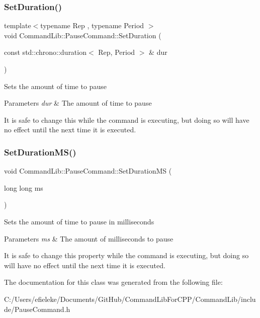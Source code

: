 \subsubsection{\texorpdfstring{Set\+Duration()}{SetDuration()}}
{\footnotesize\ttfamily template$<$typename Rep , typename Period $>$ \\
void Command\+Lib\+::\+Pause\+Command\+::\+Set\+Duration (\begin{DoxyParamCaption}\item[{const std\+::chrono\+::duration$<$ Rep, Period $>$ \&}]{dur }\end{DoxyParamCaption})\hspace{0.3cm}{\ttfamily [inline]}}



Sets the amount of time to pause 


\begin{DoxyParams}{Parameters}
{\em dur} & The amount of time to pause\\
\hline
\end{DoxyParams}


It is safe to change this while the command is executing, but doing so will have no effect until the next time it is executed.\mbox{\label{class_command_lib_1_1_pause_command_a87681b8e122468292369874bad63bc8e}} 
\subsubsection{\texorpdfstring{Set\+Duration\+M\+S()}{SetDurationMS()}}
{\footnotesize\ttfamily void Command\+Lib\+::\+Pause\+Command\+::\+Set\+Duration\+MS (\begin{DoxyParamCaption}\item[{long long}]{ms }\end{DoxyParamCaption})}



Sets the amount of time to pause in milliseconds 


\begin{DoxyParams}{Parameters}
{\em ms} & The amount of milliseconds to pause\\
\hline
\end{DoxyParams}


It is safe to change this property while the command is executing, but doing so will have no effect until the next time it is executed.

The documentation for this class was generated from the following file\+:\begin{DoxyCompactItemize}
\item 
C\+:/\+Users/efieleke/\+Documents/\+Git\+Hub/\+Command\+Lib\+For\+C\+P\+P/\+Command\+Lib/include/Pause\+Command.\+h\end{DoxyCompactItemize}
